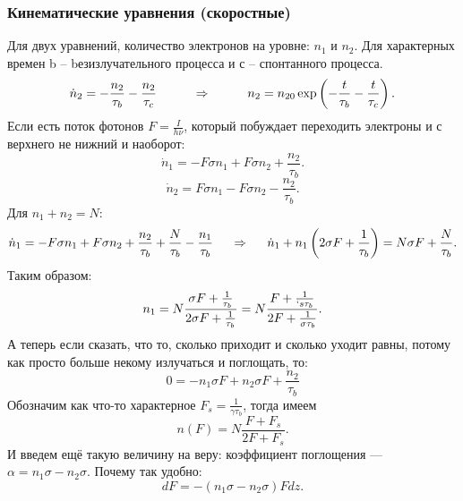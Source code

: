 \subsubsection*{Кинематические уравнения (скоростные)}
Для двух уравнений, количество электронов на уровне: $n_1$ и $n_2$. Для характерных времен b -- bезизлучательного процесса и с -- спонтанного процесса.
\begin{equation*}
	\dot{n}_2 = - \frac{n_2}{\tau_b} - \frac{n_2}{\tau_c}
	\hspace{1 cm}
	\Rightarrow
	\hspace{1 cm}
	n_2 = n_{2 0 } \exp\left(- \frac{t}{\tau_b} - \frac{t}{\tau_c}\right).
\end{equation*}
Если есть поток фотонов $F = \frac{I}{h\nu}$, который побуждает переходить электроны и с верхнего не нижний и наоборот:
\begin{equation*}
	\dot{n}_1 = - F \sigma n_1 + F \sigma n_2 +\frac{n_2}{\tau_b}.
\end{equation*}
\begin{equation*}
	\dot{n}_2 = F \sigma n_1 - F \sigma n_2 -\frac{n_2}{\tau_b}.	
\end{equation*}
Для $n_1 + n_2 = N$:
\begin{equation*}
	\dot{n}_1 = - F \sigma n_1 + F \sigma n_2 +\frac{n_2}{\tau_b} + \frac{N}{\tau_b} - \frac{n_1}{\tau_b}
	\hspace{0.5 cm}
	\Rightarrow
	\hspace{0.5 cm}
	\dot{n}_1 + n_1 \left(2 \sigma F + \frac{1}{\tau_b}\right) = N \sigma F + \frac{N}{\tau_b}.
\end{equation*}
Таким образом:
\begin{equation*}
	n_1 = N \frac{\sigma F + \frac{1}{\tau_b}}{2 \sigma F + \frac{1}{\tau_b}} = N \frac{F + \frac{1}{`s \tau_b}}{2 F + \frac{1}{\sigma \tau_b}}.
\end{equation*}
А теперь если сказать, что то, сколько приходит и сколько уходит равны, потому как просто больше некому излучаться и поглощать, то:
\begin{equation*}
	0 = - n_1 \sigma F + n_2 \sigma F + \frac{n_2}{\tau_b}
\end{equation*}
Обозначим как что-то характерное $F_s = \frac{1}{\gamma \tau_b}$, тогда имеем 
\begin{equation*}
	n(F) = N \frac{F + F_s}{2 F + F_s}.
\end{equation*}
И введем ещё такую величину на веру: коэффициент поглощения --- $\alpha = n_1 \sigma - n_2 \sigma$. Почему так удобно:
\begin{equation*}
	d F = - (n_1 \sigma - n_2 \sigma) F d z.
\end{equation*}

